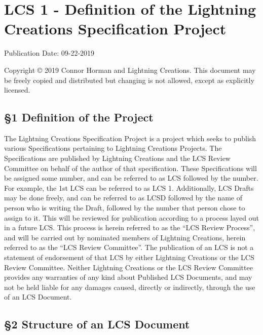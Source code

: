 \hypertarget{lcs-1---definition-of-the-lightning-creations-specification-project}{%
\section{LCS 1 - Definition of the Lightning Creations Specification
Project}\label{lcs-1---definition-of-the-lightning-creations-specification-project}}

Publication Date: 09-22-2019

Copyright © 2019 Connor Horman and Lightning Creations. This document
may be freely copied and distributed but changing is not allowed, except
as explicitly licensed.

\hypertarget{definition-of-the-project}{%
\subsection{§1 Definition of the
Project}\label{definition-of-the-project}}

The Lightning Creations Specification Project is a project which seeks
to publish various Specifications pertaining to Lightning Creations
Projects. The Specifications are published by Lightning Creations and
the LCS Review Committee on behalf of the author of that specification.
These Specifications will be assigned some number, and can be referred
to as LCS followed by the number. For example, the 1st LCS can be
referred to as LCS 1. Additionally, LCS Drafts may be done freely, and
can be referred to as LCSD followed by the name of person who is writing
the Draft, followed by the number that person chose to assign to it.
This will be reviewed for publication according to a process layed out
in a future LCS. This process is herein referred to as the ``LCS Review
Process'', and will be carried out by nominated members of Lightning
Creations, herein referred to as the ``LCS Review Committee''. The
publication of an LCS is not a statement of endorsement of that LCS by
either Lightning Creations or the LCS Review Committee. Neither
Lightning Creations or the LCS Review Committee provides any warranties
of any kind about Published LCS Documents, and may not be held liable
for any damages caused, directly or indirectly, through the use of an
LCS Document.

\hypertarget{structure-of-an-lcs-document}{%
\subsection{§2 Structure of an LCS
Document}\label{structure-of-an-lcs-document}}

